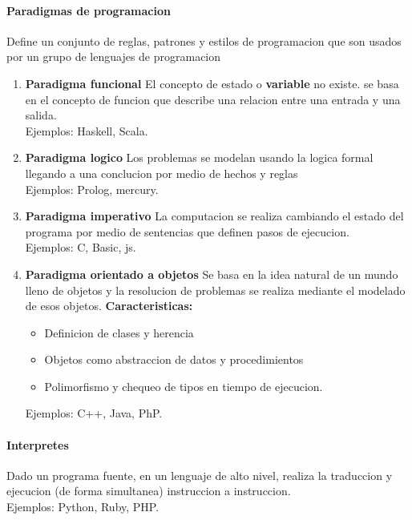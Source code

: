 \documentclass[11pt]{article}
\begin{document}
\paragraph{Paradigmas de programacion}
Define un conjunto de reglas, patrones y estilos de programacion que son usados por un grupo de lenguajes de programacion
\begin{enumerate}
	\item \textbf{Paradigma funcional} El concepto de estado o \textbf{variable} no existe. se basa en el concepto de funcion
		que describe una relacion entre una entrada y una salida.\\
		Ejemplos: Haskell, Scala.
		\item \textbf{Paradigma logico} Los problemas se modelan usando la logica formal llegando a una conclucion por medio de 			hechos y reglas\\
		Ejemplos: Prolog, mercury.
		\item \textbf{Paradigma imperativo} La computacion se realiza cambiando el estado del programa por medio de sentencias 			que definen pasos de ejecucion.\\
		Ejemplos: C, Basic, js.
		\item \textbf{Paradigma orientado a objetos} Se basa en la idea natural de un mundo lleno de objetos
				y la resolucion de problemas se realiza mediante el modelado de esos objetos.
		\textbf{Caracteristicas:}		
		\begin{itemize}
			\item Definicion de clases y herencia
			\item Objetos como abstraccion de datos y procedimientos
			\item Polimorfismo y chequeo de tipos en tiempo de ejecucion.
		\end{itemize}
		Ejemplos: C++, Java, PhP.
\end{enumerate}
\paragraph{Interpretes} Dado un programa fuente, en un lenguaje de alto nivel, realiza la traduccion y ejecucion (de forma simultanea) instruccion a instruccion.\\
Ejemplos: Python, Ruby, PHP.
\end{document}
